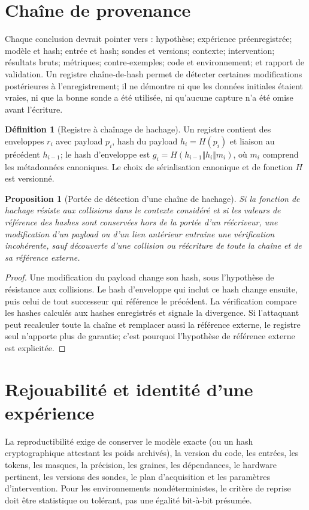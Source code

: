 \documentclass[11pt,oneside]{book}
\newtheorem{proposition}[theoreme]{Proposition}
\theoremstyle{definition}
\newtheorem{definition}[theoreme]{Définition}
\theoremstyle{remark}
\newcommand{\1}{\mathbf 1}
\begin{document}
\section{Chaîne de provenance}
Chaque conclusion devrait pointer vers : hypothèse; expérience préenregistrée; modèle et hash; entrée et hash; sondes et versions; contexte; intervention; résultats bruts; métriques; contre-exemples; code et environnement; et rapport de validation. Un registre chaîne-de-hash permet de détecter certaines modifications postérieures à l'enregistrement; il ne démontre ni que les données initiales étaient vraies, ni que la bonne sonde a été utilisée, ni qu'aucune capture n'a été omise avant l'écriture.

\begin{definition}[Registre à chaînage de hachage]
Un registre contient des enveloppes $r_i$ avec payload $p_i$, hash du payload $h_i=H(p_i)$ et liaison au précédent $h_{i-1}$; le hash d'enveloppe est $g_i=H(h_{i-1}\Vert h_i\Vert m_i)$, où $m_i$ comprend les métadonnées canoniques. Le choix de sérialisation canonique et de fonction $H$ est versionné.
\end{definition}

\begin{proposition}[Portée de détection d'une chaîne de hachage]
Si la fonction de hachage résiste aux collisions dans le contexte considéré et si les valeurs de référence des hashes sont conservées hors de la portée d'un réécriveur, une modification d'un payload ou d'un lien antérieur entraîne une vérification incohérente, sauf découverte d'une collision ou réécriture de toute la chaîne et de sa référence externe.
\end{proposition}
\begin{proof}
Une modification du payload change son hash, sous l'hypothèse de résistance aux collisions. Le hash d'enveloppe qui inclut ce hash change ensuite, puis celui de tout successeur qui référence le précédent. La vérification compare les hashes calculés aux hashes enregistrés et signale la divergence. Si l'attaquant peut recalculer toute la chaîne et remplacer aussi la référence externe, le registre seul n'apporte plus de garantie; c'est pourquoi l'hypothèse de référence externe est explicitée.
\end{proof}

\section{Rejouabilité et identité d'une expérience}
La reproductibilité exige de conserver le modèle exacte (ou un hash cryptographique attestant les poids archivés), la version du code, les entrées, les tokens, les masques, la précision, les graines, les dépendances, le hardware pertinent, les versions des sondes, le plan d'acquisition et les paramètres d'intervention. Pour les environnements nondéterministes, le critère de reprise doit être statistique ou tolérant, pas une égalité bit-à-bit présumée.
\end{document}
